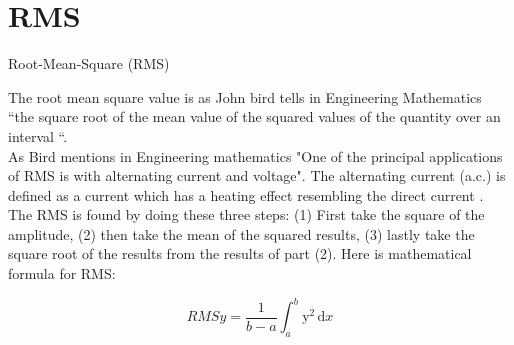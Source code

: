 \section{RMS}
Root-Mean-Square (RMS)

The root mean square value is as John bird tells in Engineering Mathematics \citep{Bird2007} “the square root of the mean value of the squared values of the quantity over an interval “.
\\
As Bird mentions in Engineering mathematics "One of the principal applications of RMS is with alternating current and voltage". \citep{Bird2007} The alternating current (a.c.) is defined as a current which has a heating effect resembling the direct current \citep{Bird2007}.
\\
The RMS is found by doing these three steps:
(1) First take the square of the amplitude, (2) then take the mean of the squared results, (3) lastly take the square root of the results from the results of part (2)\citep{Bird2007}. Here is \cite{Bird2007} mathematical formula for RMS:

\begin{equation}\label{eq:RMS formular}
RMSy = \frac{1}{b-a}\int_a^b\mathrm{y}^{2}\,\mathrm{d}x
\end{equation}

